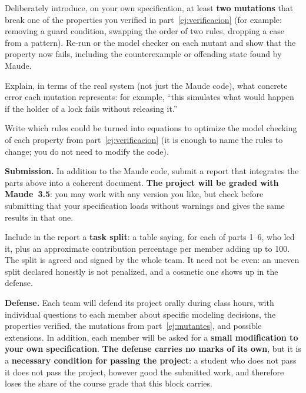 \begin{listaejercicios}
\item\label{ej:mutantes}
Deliberately introduce, on your own specification, at least \textbf{two
mutations} that break one of the properties you verified in
part~\ref{ej:verificacion} (for example: removing a guard condition,
swapping the order of two rules, dropping a case from a pattern). Re-run
\verb@search@ or the model checker on each mutant and show that the
property now fails, including the counterexample or offending state found
by Maude.

Explain, in terms of the real system (not just the Maude code), what
concrete error each mutation represents: for example, ``this simulates what
would happen if the holder of a lock fails without releasing it.''

\item
Write which rules could be turned into equations to optimize the model
checking of each property from part~\ref{ej:verificacion} (it is enough to
name the rules to change; you do not need to modify the code).

\end{listaejercicios}

\bigskip
\noindent\textbf{Submission.} In addition to the Maude code, submit a
report that integrates the parts above into a coherent document.
\textbf{The project will be graded with Maude~3.5}: you may work with any
version you like, but check before submitting that your specification loads
without warnings and gives the same results in that one.

Include in the report a \textbf{task split}: a table saying, for each of
parts 1--6, who led it, plus an approximate contribution percentage per
member adding up to 100. The split is agreed and signed by the whole team.
It need not be even: an uneven split declared honestly is not penalized,
and a cosmetic one shows up in the defense.

\smallskip
\noindent\textbf{Defense.} Each team will defend its project orally during
class hours, with individual questions to each member about specific
modeling decisions, the properties verified, the mutations from
part~\ref{ej:mutantes}, and possible extensions.
%
In addition, each member will be asked for a \textbf{small modification to
your own specification}.
%
\textbf{The defense carries no marks of its own}, but it is a
\textbf{necessary condition for passing the project}: a student who does
not pass it does not pass the project, however good the submitted work, and
therefore loses the share of the course grade that this block carries.

